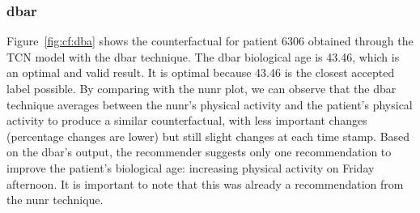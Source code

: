 \subsubsection{\gls{dbar}}
Figure~\ref{fig:cf:dba} shows the counterfactual for patient $6306$ obtained through the TCN model with the \gls{dbar} technique.
The \gls{dbar} biological age is 43.46, which is an optimal and valid result. It is optimal because 43.46 is the closest accepted label possible. By comparing with the \gls{nunr} plot, we can observe that the \gls{dbar} technique averages between the \gls{nunr}'s physical activity and the patient's physical activity to produce a similar counterfactual, with less important changes (percentage changes are lower) but still slight changes at each time stamp. Based on the \gls{dbar}'s output, the recommender suggests only one recommendation to improve the patient's biological age: increasing physical activity on Friday afternoon. It is important to note that this was already a recommendation from the \gls{nunr} technique.

